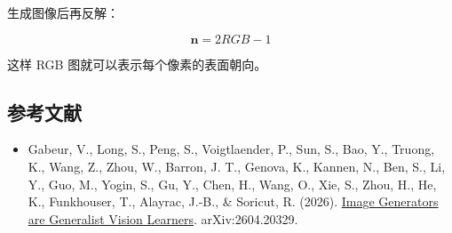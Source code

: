 生成图像后再反解：

\[
\mathbf{n} = 2RGB - 1
\]

这样 RGB 图就可以表示每个像素的表面朝向。

\FloatBarrier
{}
\hypertarget{ux53c2ux8003ux6587ux732e-149}{%
\subsection{参考文献}\label{ux53c2ux8003ux6587ux732e-149}}

\vspace{0.25em}
\begin{itemize}
\tightlist
\item
  Gabeur, V., Long, S., Peng, S., Voigtlaender, P., Sun, S., Bao, Y., Truong, K., Wang, Z., Zhou, W., Barron, J. T., Genova, K., Kannen, N., Ben, S., Li, Y., Guo, M., Yogin, S., Gu, Y., Chen, H., Wang, O., Xie, S., Zhou, H., He, K., Funkhouser, T., Alayrac, J.-B., \& Soricut, R. (2026). \href{https://arxiv.org/abs/2604.20329}{Image Generators are Generalist Vision Learners}. arXiv:2604.20329.
\end{itemize}

\clearpage
